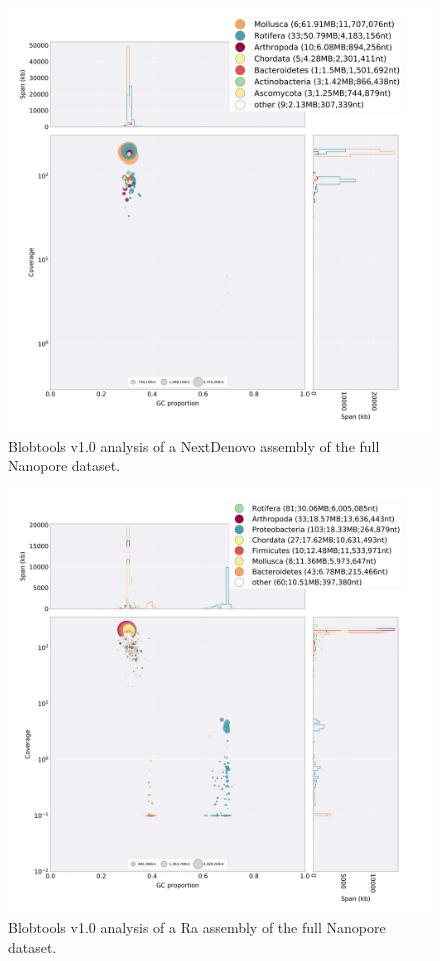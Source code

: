   \begin{figure}[ht]
    \centering
     \includegraphics[width=15cm]{fig/benchmark/ONT_ND.png}
   \caption{Blobtools v1.0 analysis of a NextDenovo assembly of the full Nanopore dataset.}
   \label{fig:blobtools_NextDenovo_ont}
 \end{figure}

  \begin{figure}[ht]
    \centering
     \includegraphics[width=15cm]{fig/benchmark/ONT_RA.png}
   \caption{Blobtools v1.0 analysis of a Ra assembly of the full Nanopore dataset.}
   \label{fig:blobtools_ra_ont}
 \end{figure}

